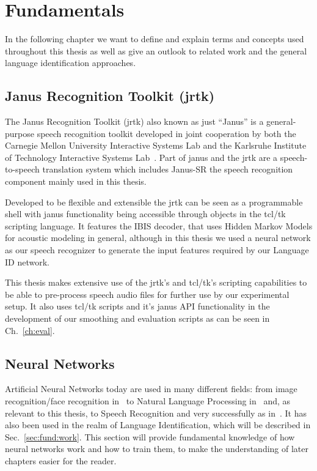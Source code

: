 

\chapter{Fundamentals}
\label{ch:fund}

In the following chapter we want to define and explain terms and concepts used throughout this thesis as well as give an outlook to related work and the general language identification approaches.

\section{Janus Recognition Toolkit (jrtk)}
\label{sec:fund:jrtk}
The Janus Recognition Toolkit (jrtk) also known as just ``Janus'' is a general-purpose speech recognition toolkit developed in joint cooperation by both the Carnegie Mellon University Interactive Systems Lab and the Karlsruhe Institute of Technology Interactive Systems Lab~\cite{lavie1997janus}. Part of janus and the jrtk are a speech-to-speech translation system which includes Janus-SR the speech recognition component mainly used in this thesis. 

Developed to be flexible and extensible the jrtk can be seen as a programmable shell with janus functionality being accessible through objects in the tcl/tk scripting language. It features the IBIS decoder, that uses Hidden Markov Models for acoustic modeling in general, although in this thesis we used a neural network as our speech recognizer to generate the input features required by our Language ID network.

This thesis makes extensive use of the jrtk's and tcl/tk's scripting capabilities to be able to pre-process speech audio files for further use by our experimental setup. It also uses tcl/tk scripts and it's janus API functionality in the development of our smoothing and evaluation scripts as can be seen in Ch.~\ref{ch:eval}.
\section{Neural Networks}
\label{sec:fund:NN}
Artificial Neural Networks today are used in many different fields: from image recognition/face recognition in~\cite{lawrence1997face} to Natural Language Processing in~\cite{collobert2008unified} and, as relevant to this thesis, to Speech Recognition and very successfully as in~\cite{hinton2012deep}. It has also been used in the realm of Language Identification, which will be described in Sec.~\ref{sec:fund:work}. This section will provide fundamental knowledge of how neural networks work and how to train them, to make the understanding of later chapters easier for the reader.

